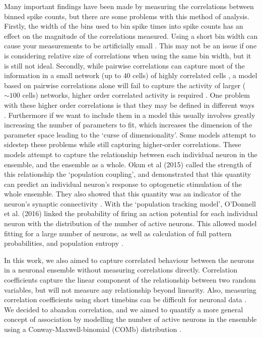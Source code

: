 Many important findings have been made by measuring the correlations between binned spike counts, but there are some problems with this method of analysis. Firstly, the width of the bins used to bin spike times into spike counts has an effect on the magnitude of the correlations measured. Using a short bin width can cause your measurements to be artificially small \parencite{cohen2}. This may not be an issue if one is considering relative size of correlations when using the same bin width, but it is still not ideal. Secondly, while pairwise correlations can capture most of the information in a small network (up to $40$ cells) of highly correlated cells \parencite{schneidman}, a model based on pairwise correlations alone will fail to capture the activity of larger ($\sim 100$ cells) networks, higher order correlated activity is required \parencite{ganmor}. One problem with these higher order correlations is that they may be defined in different ways \parencite{staude}. Furthermore if we want to include them in a model this usually involves greatly increasing the number of parameters to fit, which increases the dimension of the parameter space leading to the `curse of dimensionality'.
Some models attempt to sidestep these problems while still capturing higher-order correlations. These models attempt to capture the relationship between each individual neuron in the ensemble, and the ensemble as a whole. Okun et al (2015) called the strength of this relationship the `population coupling', and demonstrated that this quantity can predict an individual neuron's response to optogenetic stimulation of the whole ensemble. They also showed that this quantity was an indicator of the neuron's synaptic connectivity \parencite{okun}. With the `population tracking model', O'Donnell et al. (2016) linked the probability of firing an action potential for each individual neuron with the distribution of the number of active neurons. This allowed model fitting for a large number of neurons, as well as calculation of full pattern probabilities, and population entropy \parencite{odonnell}.

In this work, we also aimed to capture correlated behaviour between the neurons in a neuronal ensemble without measuring correlations directly. Correlation coefficients capture the linear component of the relationship between two random variables, but will not measure any relationship beyond linearity. Also, measuring correlation coefficients using short timebins can be difficult for neuronal data \parencite{cohen2}. We decided to abandon correlation, and we aimed to quantify a more general concept of association by modelling the number of active neurons in the ensemble using a Conway-Maxwell-binomial (COMb) distribution \parencite{kadane_2016}.

